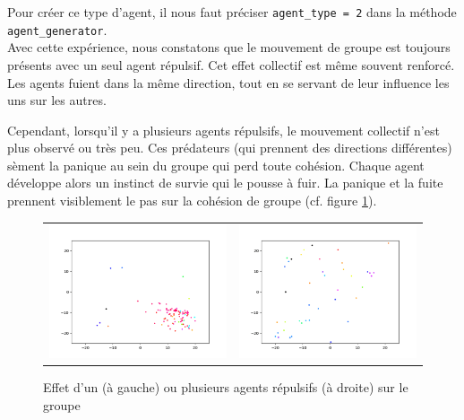 \documentclass[french, a4paper, 12pt, openany]{report}
\begin{document}
       Pour créer ce type d'agent, il nous faut préciser \verb|agent_type = 2| dans la méthode \verb|agent_generator|.\\
       
       Avec cette expérience, nous constatons que le mouvement de groupe est toujours présents avec un seul agent répulsif. Cet effet collectif est même souvent renforcé. Les agents fuient dans la même direction, tout en se servant de leur influence les uns sur les autres.
       
        Cependant, lorsqu'il y a plusieurs agents répulsifs, le mouvement collectif n'est plus observé ou très peu. Ces prédateurs (qui prennent des directions différentes) sèment la panique au sein du groupe qui perd toute cohésion. Chaque agent développe alors un instinct de survie qui le pousse à fuir. La panique et la fuite prennent visiblement le pas sur la cohésion de groupe (cf. figure \ref{repulsifs_agents}).\\
       
     \begin{figure}[!h]
		\centering
		\begin{tabular}{cc}
			\includegraphics[width=8cm]{images/image_17.png} & \includegraphics[width=8cm]{images/image_16.png} \\
		\end{tabular}
		\caption{Effet d'un (à gauche) ou plusieurs agents répulsifs (à droite) sur le groupe}
		\label{repulsifs_agents}
	\end{figure}
       
\end{document}
